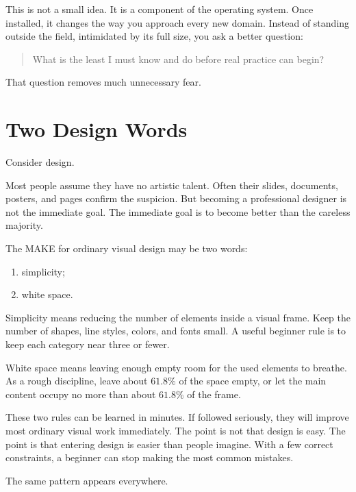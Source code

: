This is not a small idea. It is a component of the operating system. Once installed, it changes the way you approach every new domain. Instead of standing outside the field, intimidated by its full size, you ask a better question:

\begin{quote}
What is the least I must know and do before real practice can begin?
\end{quote}

That question removes much unnecessary fear.

\section*{Two Design Words}

Consider design.

Most people assume they have no artistic talent. Often their slides, documents, posters, and pages confirm the suspicion. But becoming a professional designer is not the immediate goal. The immediate goal is to become better than the careless majority.

The MAKE for ordinary visual design may be two words:

\begin{enumerate}
\item simplicity;
\item white space.
\end{enumerate}

Simplicity means reducing the number of elements inside a visual frame. Keep the number of shapes, line styles, colors, and fonts small. A useful beginner rule is to keep each category near three or fewer.

White space means leaving enough empty room for the used elements to breathe. As a rough discipline, leave about \(61.8\%\) of the space empty, or let the main content occupy no more than about \(61.8\%\) of the frame.

These two rules can be learned in minutes. If followed seriously, they will improve most ordinary visual work immediately. The point is not that design is easy. The point is that entering design is easier than people imagine. With a few correct constraints, a beginner can stop making the most common mistakes.

The same pattern appears everywhere.

